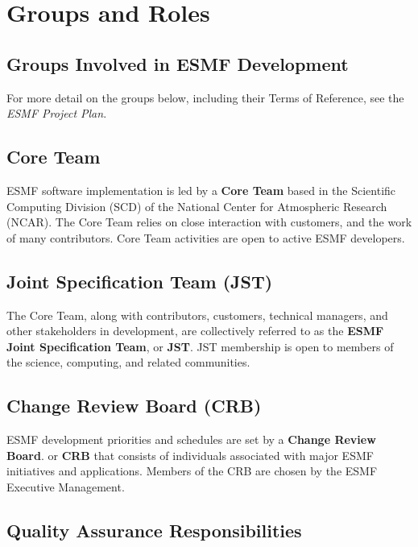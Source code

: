 
\section{Groups and Roles}

\subsection{Groups Involved in ESMF Development}

For more detail on the groups below, including their Terms of
Reference, see the {\it ESMF Project Plan}.

\subsection{Core Team}
ESMF software implementation is led by a {\bf Core Team} based in the 
Scientific Computing Division (SCD) of the National Center for
Atmospheric Research (NCAR).  The Core Team relies on close interaction
with customers, and the work of many contributors.  Core Team
activities are open to active ESMF developers.

\subsection{Joint Specification Team (JST)}
The Core Team, along with contributors, customers, technical
managers, and other stakeholders in development, are collectively
referred to as the {\bf ESMF Joint Specification Team}, or {\bf JST}.  
JST membership is open to members of the science, computing, and
related communities.

\subsection{Change Review Board (CRB)}
ESMF development priorities and schedules are set by a 
{\bf Change Review Board}. or {\bf CRB} that consists of individuals
associated with major ESMF initiatives and applications.  
Members of the CRB are chosen by the ESMF Executive Management.

\subsection{Quality Assurance Responsibilities}

